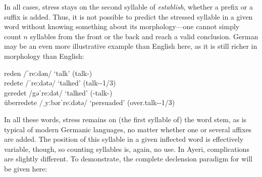 In all cases, stress stays on the second syllable of \textit{establish}, 
whether a prefix or a suffix is added. Thus, it is not possible to predict the 
stressed syllable in a given word without knowing something about its 
morphology---one cannot simply count $n$ syllables from the front or the 
back and reach a valid conclusion. German may be an even more illustrative 
example than English here, as it is still richer in morphology than English:

\ex
	reden /ˈreːdən/ `talk' (talk-\Inf{})\\
	redete /ˈreːdətə/ `talked' (talk-\Pst{}-1/3\Sg{})\\
	geredet /gəˈreːdət/ `talked' (\Ptcp{}-talk-\Ptcp{})\\
	überredete /ˌyːbərˈreːdətə/ `persuaded' (over.talk-\Pst{}-1/3\Sg{})
\xe

In all these words, stress remains on (the first syllable of) the word stem, as 
is typical of modern Germanic languages, no matter whether one or several 
affixes are added. The position of this syllable in a given inflected word is 
effectively variable, though, so counting syllables is, again, no use. In Ayeri,
complications are slightly different. To demonstrate, the complete declension 
paradigm for  will be given here:

